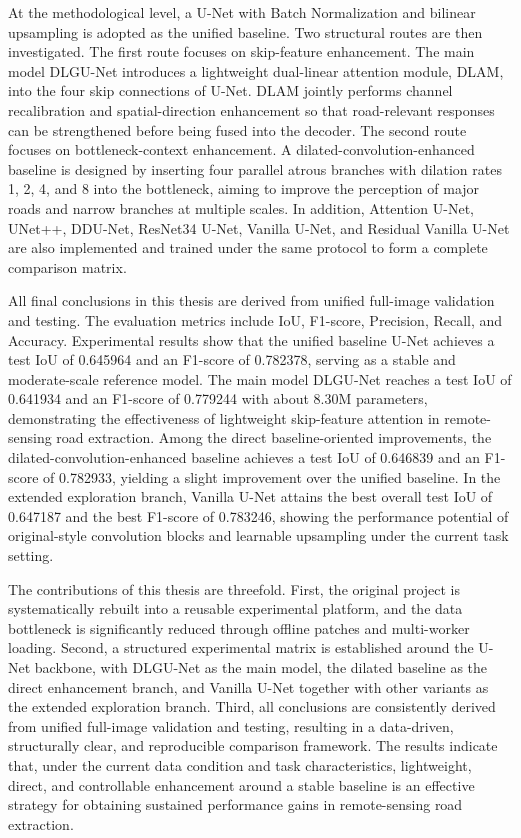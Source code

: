 \begin{abstract*}
At the methodological level, a U-Net with Batch Normalization and bilinear upsampling is adopted as the unified baseline. Two structural routes are then investigated. The first route focuses on skip-feature enhancement. The main model DLGU-Net introduces a lightweight dual-linear attention module, DLAM, into the four skip connections of U-Net. DLAM jointly performs channel recalibration and spatial-direction enhancement so that road-relevant responses can be strengthened before being fused into the decoder. The second route focuses on bottleneck-context enhancement. A dilated-convolution-enhanced baseline is designed by inserting four parallel atrous branches with dilation rates 1, 2, 4, and 8 into the bottleneck, aiming to improve the perception of major roads and narrow branches at multiple scales. In addition, Attention U-Net, UNet++, DDU-Net, ResNet34 U-Net, Vanilla U-Net, and Residual Vanilla U-Net are also implemented and trained under the same protocol to form a complete comparison matrix.

All final conclusions in this thesis are derived from unified full-image validation and testing. The evaluation metrics include IoU, F1-score, Precision, Recall, and Accuracy. Experimental results show that the unified baseline U-Net achieves a test IoU of 0.645964 and an F1-score of 0.782378, serving as a stable and moderate-scale reference model. The main model DLGU-Net reaches a test IoU of 0.641934 and an F1-score of 0.779244 with about 8.30M parameters, demonstrating the effectiveness of lightweight skip-feature attention in remote-sensing road extraction. Among the direct baseline-oriented improvements, the dilated-convolution-enhanced baseline achieves a test IoU of 0.646839 and an F1-score of 0.782933, yielding a slight improvement over the unified baseline. In the extended exploration branch, Vanilla U-Net attains the best overall test IoU of 0.647187 and the best F1-score of 0.783246, showing the performance potential of original-style convolution blocks and learnable upsampling under the current task setting.

The contributions of this thesis are threefold. First, the original project is systematically rebuilt into a reusable experimental platform, and the data bottleneck is significantly reduced through offline patches and multi-worker loading. Second, a structured experimental matrix is established around the U-Net backbone, with DLGU-Net as the main model, the dilated baseline as the direct enhancement branch, and Vanilla U-Net together with other variants as the extended exploration branch. Third, all conclusions are consistently derived from unified full-image validation and testing, resulting in a data-driven, structurally clear, and reproducible comparison framework. The results indicate that, under the current data condition and task characteristics, lightweight, direct, and controllable enhancement around a stable baseline is an effective strategy for obtaining sustained performance gains in remote-sensing road extraction.

\end{abstract*}
